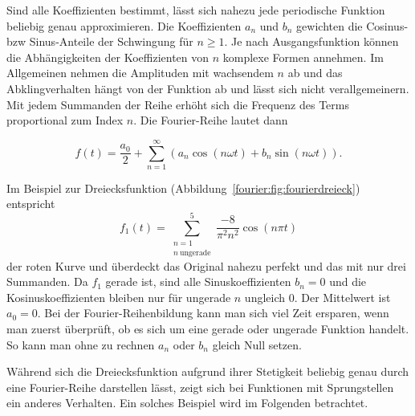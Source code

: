 Sind alle Koeffizienten bestimmt, lässt sich nahezu jede periodische Funktion beliebig genau approximieren.
Die Koeffizienten $a_n$ und $b_n$ gewichten die Cosinus- bzw Sinus-Anteile der Schwingung für $n \ge 1$.
Je nach Ausgangsfunktion können die Abhängigkeiten der Koeffizienten von $n$ komplexe Formen annehmen.
Im Allgemeinen nehmen die Amplituden mit wachsendem $n$ ab und das Abklingverhalten hängt von der Funktion ab und lässt sich nicht verallgemeinern.
Mit jedem Summanden der Reihe erhöht sich die Frequenz des Terms proportional zum Index $n$.
Die Fourier-Reihe lautet dann 

\begin{equation}\label{eq:fourier}
f(t) = \frac{a_0}{2} + \sum_{n=1}^{\infty} \left( a_n \cos\left( n\omega t \right) + b_n \sin\left( n \omega t \right) \right).
\end{equation}


\begin{beispiel}

Im Beispiel zur Dreiecksfunktion (Abbildung~\ref{fourier:fig:fourierdreieck}) entspricht  
\begin{equation}
	f_1(t) = \sum_{\substack{n=1 \\ n\ \text{ungerade}}}^{5} \frac{-8}{\pi^2 n^2} \cos(n\pi t)
\end{equation}
der roten Kurve und überdeckt das Original nahezu perfekt und das mit nur drei Summanden.  
Da $f_1$ gerade ist, sind alle Sinuskoeffizienten $b_n=0$ und die Kosinuskoeffizienten bleiben nur für ungerade $n$ ungleich $0$.  
Der Mittelwert ist $a_0=0$.  
Bei der Fourier-Reihenbildung kann man sich viel Zeit ersparen, wenn man zuerst überprüft, ob es sich um eine gerade oder ungerade Funktion handelt.
So kann man ohne zu rechnen $a_n$ oder $b_n$ gleich Null setzen.



\end{beispiel}

Während sich die Dreiecksfunktion aufgrund ihrer Stetigkeit beliebig genau durch eine Fourier-Reihe darstellen lässt, zeigt sich bei Funktionen mit Sprungstellen ein anderes Verhalten. Ein solches Beispiel wird im Folgenden betrachtet.

